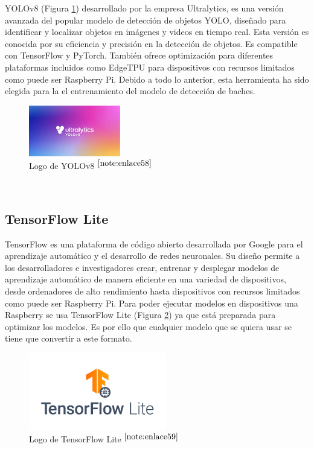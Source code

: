 \acs{YOLO}v8 (Figura \ref{fig:yolov8}) desarrollado por la empresa Ultralytics, es una versión avanzada del popular modelo de detección de objetos \ac{YOLO}, diseñado para identificar y localizar objetos en imágenes y videos en tiempo real. Esta versión es conocida por su eficiencia y precisión en la detección de objetos. Es compatible con TensorFlow y PyTorch. También ofrece optimización para diferentes plataformas incluidos como EdgeTPU para dispositivos con recursos limitados como puede ser Raspberry Pi. Debido a todo lo anterior, esta herramienta ha sido elegida para la el entrenamiento del modelo de detección de baches. 

\begin{figure} [h!]
	\begin{center}
		\includegraphics[width=4cm]{figs/yolov8.png}
	\end{center}
	\caption{Logo de YOLOv8 $^{\ref{note:enlace58}}$} 
	\label{fig:yolov8}
\end{figure}\

\setcounter{footnote}{58} %


\subsection{TensorFlow Lite}

TensorFlow es una plataforma de código abierto desarrollada por Google para el aprendizaje automático y el desarrollo de redes neuronales. Su diseño permite a los desarrolladores e investigadores crear, entrenar y desplegar modelos de aprendizaje automático de manera eficiente en una variedad de dispositivos, desde ordenadores de alto rendimiento hasta dispositivos con recursos limitados como puede ser Raspberry Pi. Para poder ejecutar modelos en dispositivos una Raspberry se usa TensorFlow Lite (Figura \ref{fig:tflite}) ya que está preparada para optimizar los modelos. Es por ello que cualquier modelo que se quiera usar se tiene que convertir a este formato. 

\begin{figure} [h!]
	\begin{center}
		\includegraphics[width=6cm]{figs/tflite.png}
	\end{center}
	\caption{Logo de TensorFlow Lite $^{\ref{note:enlace59}}$} 
	\label{fig:tflite}
\end{figure}\

